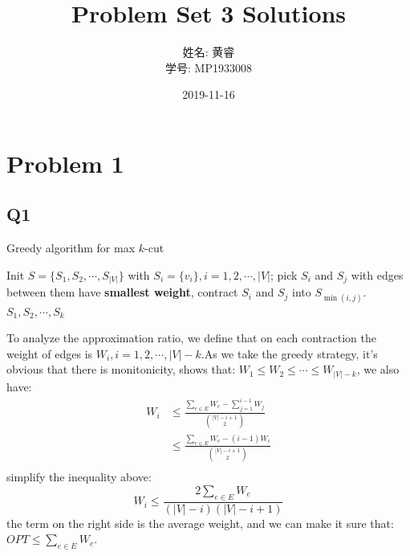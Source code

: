 \documentclass[a4paper, 12pt, titlepage]{article}
\begin{document}
\title{Problem Set 3 Solutions}
\author{姓名: 黄睿 \\ 学号: MP1933008}
\date{2019-11-16}


\maketitle

\section{Problem 1}

\subsection{Q1}
\begin{algorithm}[h]
    \caption{Greedy algorithm for max $k$-cut}
    \begin{algorithmic}[1]
        \State Init $S = \{S_1, S_2, \cdots, S_{|V|} \}$ with $S_{i} = \{ v_{i} \}, i = 1, 2, \cdots, |V| $;
 			\State pick $S_{i}$ and $S_{j}$ with edges between them have {\bf smallest weight},  contract $S_{i}$ and $S_{j}$ into $S_{\min{(i, j)}}$.
        \EndWhile
        \State \Return $S_1, S_2, \cdots, S_{k}$
    \end{algorithmic}
\end{algorithm}

To analyze the approximation ratio, we define that on each contraction the weight of edges is $W_{i}, i= 1, 2, \cdots, |V|-k$.As we take the greedy strategy, it's obvious that there is monitonicity, shows that: $W_{1} \leq W_{2} \leq \cdots \leq W_{|V| - k}$, we also have:
\begin{equation}
	\begin{aligned}
		W_i &\leq \frac{\sum_{e \in E} W_e - \sum_{j = 1}^{i - 1} W_{j}}{\binom{|V| - i + 1}{2}} \\
			&\leq \frac{\sum_{e \in E} W_e - (i - 1) W_i}{\binom{|V| - i + 1}{2}} \\
	\end{aligned}
\end{equation}
simplify the inequality above:
\[
	W_i \leq \frac{2 \sum_{e \in E} W_{e}}{(|V| - i)(|V| -i + 1)}
\]
the term on the right side is the average weight, and we can make it sure that:$OPT \leq \sum_{e \in E} W_{e}$.
\end{document}
